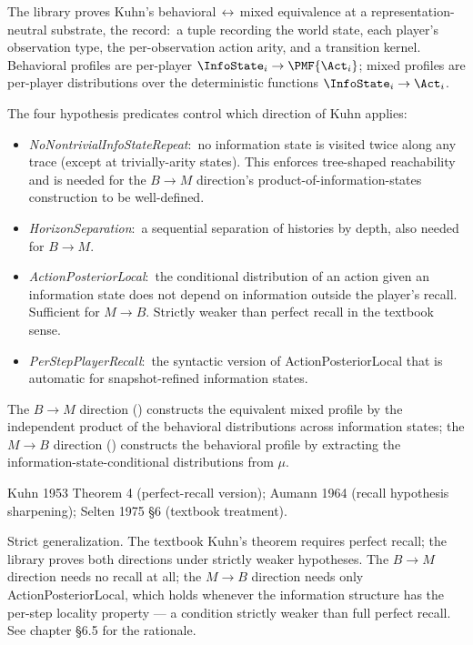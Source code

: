 \Mathematical
The library proves Kuhn's behavioral$\,\leftrightarrow\,$mixed
equivalence at a representation-neutral substrate, the
 record:\ a tuple recording the world state, each
player's observation type, the per-observation action arity, and
a transition kernel.  Behavioral profiles are per-player
$\InfoState_i \to \PMF{\Act_i}$; mixed profiles are per-player
distributions over the deterministic functions
$\InfoState_i \to \Act_i$.

The four hypothesis predicates control which direction of Kuhn
applies:
\begin{itemize}\itemsep1pt
\item \emph{NoNontrivialInfoStateRepeat}:\ no information state
  is visited twice along any trace (except at trivially-arity
  states).  This enforces tree-shaped reachability and is needed
  for the $B \to M$ direction's product-of-information-states
  construction to be well-defined.
\item \emph{HorizonSeparation}:\ a sequential separation of
  histories by depth, also needed for $B \to M$.
\item \emph{ActionPosteriorLocal}:\ the conditional distribution
  of an action given an information state does not depend on
  information outside the player's recall.  Sufficient for $M \to
  B$.  Strictly weaker than perfect recall in the textbook sense.
\item \emph{PerStepPlayerRecall}:\ the syntactic version of
  ActionPosteriorLocal that is automatic for snapshot-refined
  information states.
\end{itemize}

The $B \to M$ direction () constructs
the equivalent mixed profile by the independent product of the
behavioral distributions across information states; the
$M \to B$ direction ()
constructs the behavioral profile by extracting the
information-state-conditional distributions from $\mu$.

\Textbook
Kuhn 1953 Theorem 4 (perfect-recall version); Aumann 1964 (recall
hypothesis sharpening); Selten 1975 §6 (textbook treatment).

\Faithfulness
Strict generalization.  The textbook Kuhn's theorem requires
perfect recall; the library proves both directions under
strictly weaker hypotheses.  The $B \to M$ direction needs no
recall at all; the $M \to B$ direction needs only
ActionPosteriorLocal, which holds whenever the information
structure has the per-step locality property — a condition
strictly weaker than full perfect recall.  See chapter §6.5 for
the rationale.

